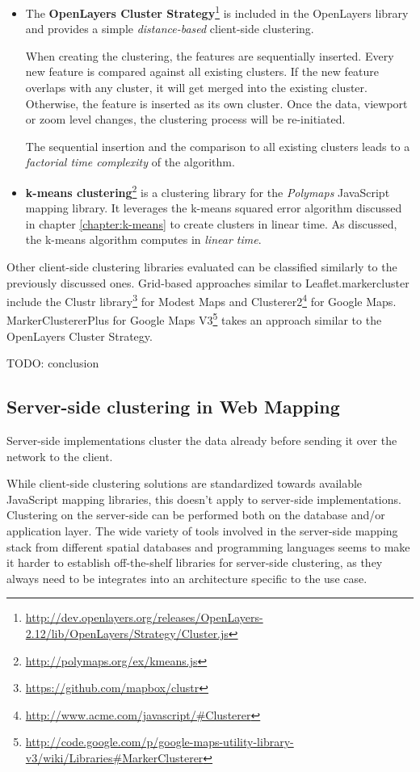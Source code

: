 \begin{itemize}
\item The \textbf{OpenLayers Cluster Strategy}\footnote{\url{http://dev.openlayers.org/releases/OpenLayers-2.12/lib/OpenLayers/Strategy/Cluster.js}} is included in the OpenLayers library and provides a simple \textit{distance-based} client-side clustering.

When creating the clustering, the features are sequentially inserted. Every new feature is compared against all existing clusters. If the new feature overlaps with any cluster, it will get merged into the existing cluster. Otherwise, the feature is inserted as its own cluster. Once the data, viewport or zoom level changes, the clustering process will be re-initiated. 

The sequential insertion and the comparison to all existing clusters leads to a \textit{factorial time complexity} of the algorithm. 

\item \textbf{k-means clustering}\footnote{\url{http://polymaps.org/ex/kmeans.js}} is a clustering library for the \textit{Polymaps} JavaScript mapping library. It leverages the k-means squared error algorithm discussed in chapter \ref{chapter:k-means} to create clusters in linear time. As discussed, the k-means algorithm computes in \textit{linear time}.

\end{itemize}

Other client-side clustering libraries evaluated can be classified similarly to the previously discussed ones. Grid-based approaches similar to Leaflet.markercluster include the Clustr library\footnote{\url{https://github.com/mapbox/clustr}} for Modest Maps and Clusterer2\footnote{\url{http://www.acme.com/javascript/\#Clusterer}} for Google Maps. MarkerClustererPlus for Google Maps V3\footnote{\url{http://code.google.com/p/google-maps-utility-library-v3/wiki/Libraries\#MarkerClusterer}} takes an approach similar to the OpenLayers Cluster Strategy.

TODO: conclusion

\subsection{Server-side clustering in Web Mapping}

Server-side implementations cluster the data already before sending it over the network to the client.

While client-side clustering solutions are standardized towards available JavaScript mapping libraries, this doesn't apply to server-side implementations. Clustering on the server-side can be performed both on the database and/or application layer. The wide variety of tools involved in the server-side mapping stack from different spatial databases and programming languages seems to make it harder to establish off-the-shelf libraries for server-side clustering, as they always need to be integrates into an architecture specific to the use case.

